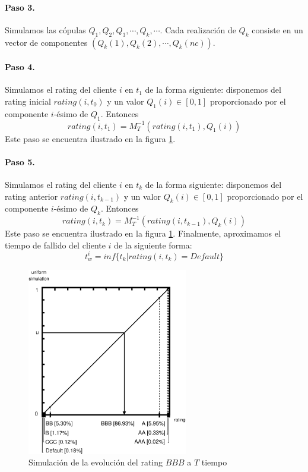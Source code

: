 \paragraph{Paso 3.} Simulamos las c\'opulas $Q_1, Q_2, Q_3, \cdots, Q_k, \cdots$.
Cada realizaci\'on de $Q_k$ consiste en un vector de componentes
$(Q_k(1), Q_k(2), \cdots, Q_k(nc))$.

\paragraph{Paso 4.} Simulamos el rating del cliente $i$ en $t_1$ de la forma siguiente:
disponemos del rating inicial $rating(i,t_0)$ y un valor $Q_1(i) \in [0,1]$
proporcionado por el componente $i$-\'esimo de $Q_1$. Entonces
\begin{displaymath}
rating(i,t_1) = M_T^{-1}(rating(i,t_1),Q_1(i))
\end{displaymath}
Este paso se encuentra ilustrado en la figura \ref{simrp}.

\paragraph{Paso 5.} Simulamos el rating del cliente $i$ en $t_k$ de la forma siguiente:
disponemos del rating anterior $rating(i,t_{k-1})$ y un valor $Q_k(i) \in [0,1]$
proporcionado por el componente $i$-\'esimo de $Q_k$. Entonces
\begin{displaymath}
rating(i,t_k) = M_T^{-1}(rating(i,t_{k-1}),Q_k(i))
\end{displaymath}
Este paso se encuentra ilustrado en la figura \ref{simrp}. Finalmente, aproximamos
el tiempo de fallido del cliente $i$ de la siguiente forma:
\begin{displaymath}
t_w^i = inf\{t_k | rating(i,t_k) = Default\}
\end{displaymath}

\begin{figure}[!hb]
\begin{center}
\includegraphics[width=7cm,angle=0]{./images/simrp.eps}
\caption{Simulaci\'on de la evoluci\'on del rating $BBB$ a $T$ tiempo}
\label{simrp}
\end{center}
\end{figure}

